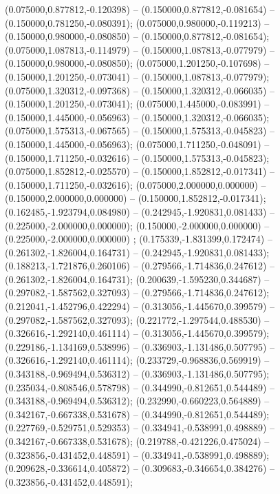  (0.075000,0.877812,-0.120398) -- (0.150000,0.877812,-0.081654) -- (0.150000,0.781250,-0.080391);
 (0.075000,0.980000,-0.119213) -- (0.150000,0.980000,-0.080850) -- (0.150000,0.877812,-0.081654);
 (0.075000,1.087813,-0.114979) -- (0.150000,1.087813,-0.077979) -- (0.150000,0.980000,-0.080850);
 (0.075000,1.201250,-0.107698) -- (0.150000,1.201250,-0.073041) -- (0.150000,1.087813,-0.077979);
 (0.075000,1.320312,-0.097368) -- (0.150000,1.320312,-0.066035) -- (0.150000,1.201250,-0.073041);
 (0.075000,1.445000,-0.083991) -- (0.150000,1.445000,-0.056963) -- (0.150000,1.320312,-0.066035);
 (0.075000,1.575313,-0.067565) -- (0.150000,1.575313,-0.045823) -- (0.150000,1.445000,-0.056963);
 (0.075000,1.711250,-0.048091) -- (0.150000,1.711250,-0.032616) -- (0.150000,1.575313,-0.045823);
 (0.075000,1.852812,-0.025570) -- (0.150000,1.852812,-0.017341) -- (0.150000,1.711250,-0.032616);
 (0.075000,2.000000,0.000000) -- (0.150000,2.000000,0.000000) -- (0.150000,1.852812,-0.017341);
 (0.162485,-1.923794,0.084980) -- (0.242945,-1.920831,0.081433) -- (0.225000,-2.000000,0.000000);
 (0.150000,-2.000000,0.000000) -- (0.225000,-2.000000,0.000000) ;
 (0.175339,-1.831399,0.172474) -- (0.261302,-1.826004,0.164731) -- (0.242945,-1.920831,0.081433);
 (0.188213,-1.721876,0.260106) -- (0.279566,-1.714836,0.247612) -- (0.261302,-1.826004,0.164731);
 (0.200639,-1.595230,0.344687) -- (0.297082,-1.587562,0.327093) -- (0.279566,-1.714836,0.247612);
 (0.212041,-1.452796,0.422294) -- (0.313056,-1.445670,0.399579) -- (0.297082,-1.587562,0.327093);
 (0.221772,-1.297544,0.488530) -- (0.326616,-1.292140,0.461114) -- (0.313056,-1.445670,0.399579);
 (0.229186,-1.134169,0.538996) -- (0.336903,-1.131486,0.507795) -- (0.326616,-1.292140,0.461114);
 (0.233729,-0.968836,0.569919) -- (0.343188,-0.969494,0.536312) -- (0.336903,-1.131486,0.507795);
 (0.235034,-0.808546,0.578798) -- (0.344990,-0.812651,0.544489) -- (0.343188,-0.969494,0.536312);
 (0.232990,-0.660223,0.564889) -- (0.342167,-0.667338,0.531678) -- (0.344990,-0.812651,0.544489);
 (0.227769,-0.529751,0.529353) -- (0.334941,-0.538991,0.498889) -- (0.342167,-0.667338,0.531678);
 (0.219788,-0.421226,0.475024) -- (0.323856,-0.431452,0.448591) -- (0.334941,-0.538991,0.498889);
 (0.209628,-0.336614,0.405872) -- (0.309683,-0.346654,0.384276) -- (0.323856,-0.431452,0.448591);
